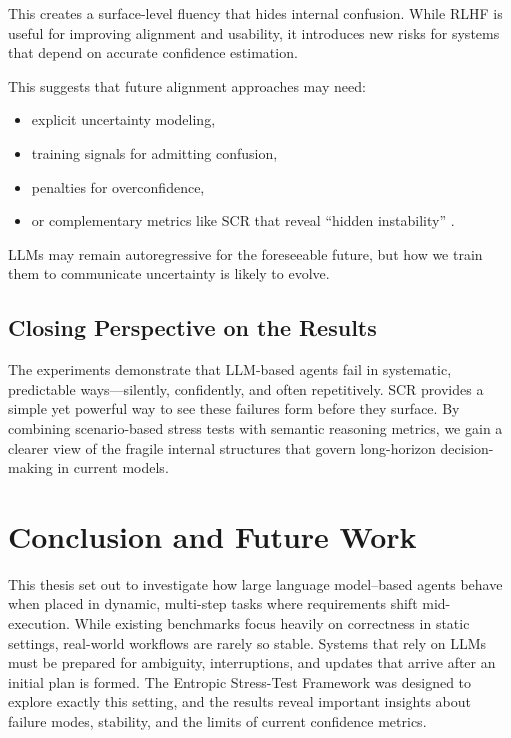 \documentclass[12pt,a4paper]{report}
\begin{document}
This creates a surface-level fluency that hides internal confusion. While RLHF is useful for improving alignment and usability, it introduces new risks for systems that depend on accurate confidence estimation.

This suggests that future alignment approaches may need:
\begin{itemize}
    \item explicit uncertainty modeling,
    \item training signals for admitting confusion,
    \item penalties for overconfidence,
    \item or complementary metrics like SCR that reveal “hidden instability” \cite{Chen2025Overconfidence, Perez2022Discovering, Perez2024Mislead, Wang2024StyleOutweighs}.
\end{itemize}

LLMs may remain autoregressive for the foreseeable future, but how we train them to communicate uncertainty is likely to evolve.

\section{Closing Perspective on the Results}
The experiments demonstrate that LLM-based agents fail in systematic, predictable ways—silently, confidently, and often repetitively. SCR provides a simple yet powerful way to see these failures form before they surface. By combining scenario-based stress tests with semantic reasoning metrics, we gain a clearer view of the fragile internal structures that govern long-horizon decision-making in current models.

\chapter{Conclusion and Future Work}

This thesis set out to investigate how large language model–based agents behave when placed in dynamic, multi-step tasks where requirements shift mid-execution. While existing benchmarks focus heavily on correctness in static settings, real-world workflows are rarely so stable. Systems that rely on LLMs must be prepared for ambiguity, interruptions, and updates that arrive after an initial plan is formed. The Entropic Stress-Test Framework was designed to explore exactly this setting, and the results reveal important insights about failure modes, stability, and the limits of current confidence metrics.
\end{document}
